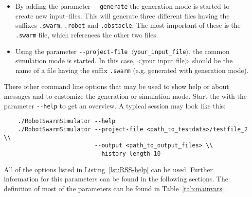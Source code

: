 \documentclass[a4paper,halfparskip,11pt,twoside]{scrartcl}
\begin{document}
\begin{itemize}
 \item By adding the parameter {\tt -{}-generate} the generation mode is started to create new input--files. This will generate three different files having the suffixes {\tt .swarm}, {\tt .robot} and {\tt .obstacle}. The most important of these is the {\tt .swarm} file, which references the other two files.
\item Using the parameter {\tt -{}-project-file $\langle$your\_input\_file$\rangle$}, the common simulation mode is started. In this case, <your input file> should be the name of a file having the suffix {\tt .swarm} (e.g. generated with generation mode).
\end{itemize}

There other command line options that may be used to show help or about messages and to customize the generation or simulation mode. Start the \RSS with the parameter {\tt -{}-help} to get an overview. A typical session may look like this:

\begin{verbatim}
    ./RobotSwarmSimulator --help
    ./RobotSwarmSimulator --project-file <path_to_testdata>/testfile_2 \\
                          --output <path_to_output_files> \\
                          --history-length 10
\end{verbatim}

All of the options listed in Listing~\ref{lst:RSS-help} can be used. Further information for this parameters can be found in the following sections. The definition of most of the parameters can be found in Table~\ref{tab:mainvars}.
\end{document}
